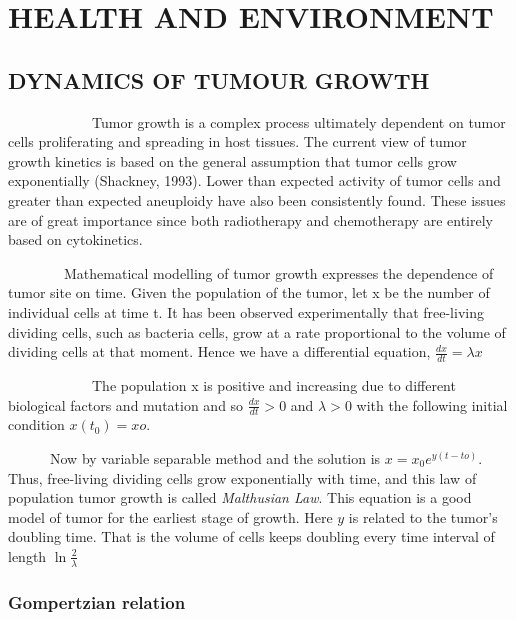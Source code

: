 \chapter[HEALTH AND ENVIRONMENT]{\textbf{HEALTH AND ENVIRONMENT}}
\thispagestyle{empty}



\section{DYNAMICS OF TUMOUR GROWTH}

\par ~~~~~~~~~~~~Tumor growth is a complex process ultimately dependent on tumor cells proliferating and spreading in host tissues. The current view of tumor growth kinetics is based on the general assumption that tumor cells grow exponentially (Shackney, 1993). Lower than expected activity of tumor cells and greater than expected aneuploidy have also been consistently found. These issues are of great importance since both radiotherapy and chemotherapy are entirely based on cytokinetics.

\par ~~~~~~~~Mathematical modelling of tumor growth expresses the dependence of tumor site on time. Given the population of the tumor, let x be the number of individual cells at time t. It has been observed experimentally that free-living dividing cells, such as bacteria cells, grow at a rate proportional to the volume of dividing cells at that moment.
\newline Hence   we  have  a  differential equation, $ \frac{dx}{dt}=\lambda x $ 


\par ~~~~~~~~~~~~The population x is positive and increasing due to different biological factors and mutation and so
 $ \frac{dx}{dt}>0 $    
and $\lambda >0$ with the following initial condition $ x(t_{0})=xo $.
          
~~~~~~Now by variable separable method and the solution is $ x=x_{0}e^{y(t-to)} $.
%
Thus, free-living dividing cells grow exponentially with time, and this law of population tumor growth is called \textit{Malthusian Law}. This equation  is  a  good  model  of tumor for the earliest stage of growth. Here $y$ is related to the tumor’s doubling time. That is the volume of cells keeps doubling every time interval of length $ \ln\frac{2}{\lambda}$

\subsection{Gompertzian relation}



